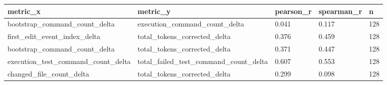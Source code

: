 \begin{tabular}{lllll}
\toprule
metric\_x & metric\_y & pearson\_r & spearman\_r & n \\
\midrule
bootstrap\_command\_count\_delta & execution\_command\_count\_delta & 0.041 & 0.117 & 128 \\
first\_edit\_event\_index\_delta & total\_tokens\_corrected\_delta & 0.376 & 0.459 & 128 \\
bootstrap\_command\_count\_delta & total\_tokens\_corrected\_delta & 0.371 & 0.447 & 128 \\
execution\_test\_command\_count\_delta & total\_failed\_test\_command\_count\_delta & 0.607 & 0.553 & 128 \\
changed\_file\_count\_delta & total\_tokens\_corrected\_delta & 0.299 & 0.098 & 128 \\
\bottomrule
\end{tabular}
